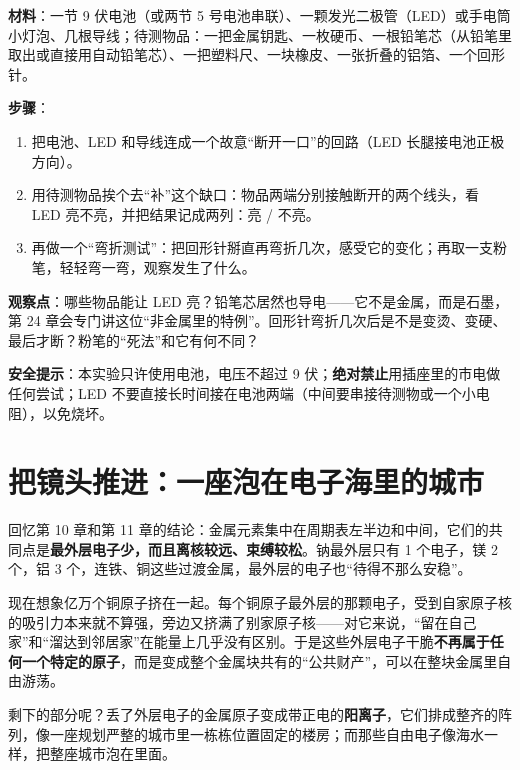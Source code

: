 \begin{shiyan}
\textbf{材料}：一节 9 伏电池（或两节 5 号电池串联）、一颗发光二极管（LED）或手电筒小灯泡、几根导线；待测物品：一把金属钥匙、一枚硬币、一根铅笔芯（从铅笔里取出或直接用自动铅笔芯）、一把塑料尺、一块橡皮、一张折叠的铝箔、一个回形针。

\textbf{步骤}：
\begin{enumerate}[itemsep=1pt]
\item 把电池、LED 和导线连成一个故意“断开一口”的回路（LED 长腿接电池正极方向）。
\item 用待测物品挨个去“补”这个缺口：物品两端分别接触断开的两个线头，看 LED 亮不亮，并把结果记成两列：亮 / 不亮。
\item 再做一个“弯折测试”：把回形针掰直再弯折几次，感受它的变化；再取一支粉笔，轻轻弯一弯，观察发生了什么。
\end{enumerate}

\textbf{观察点}：哪些物品能让 LED 亮？铅笔芯居然也导电——它不是金属，而是石墨，第 24 章会专门讲这位“非金属里的特例”。回形针弯折几次后是不是变烫、变硬、最后才断？粉笔的“死法”和它有何不同？

\textbf{安全提示}：本实验只许使用电池，电压不超过 9 伏；\textbf{绝对禁止}用插座里的市电做任何尝试；LED 不要直接长时间接在电池两端（中间要串接待测物或一个小电阻），以免烧坏。
\end{shiyan}

\section{把镜头推进：一座泡在电子海里的城市}

回忆第 10 章和第 11 章的结论：金属元素集中在周期表左半边和中间，它们的共同点是\textbf{最外层电子少，而且离核较远、束缚较松}。钠最外层只有 1 个电子，镁 2 个，铝 3 个，连铁、铜这些过渡金属，最外层的电子也“待得不那么安稳”。

现在想象亿万个铜原子挤在一起。每个铜原子最外层的那颗电子，受到自家原子核的吸引力本来就不算强，旁边又挤满了别家原子核——对它来说，“留在自己家”和“溜达到邻居家”在能量上几乎没有区别。于是这些外层电子干脆\textbf{不再属于任何一个特定的原子}，而是变成整个金属块共有的“公共财产”，可以在整块金属里自由游荡。

剩下的部分呢？丢了外层电子的金属原子变成带正电的\textbf{阳离子}，它们排成整齐的阵列，像一座规划严整的城市里一栋栋位置固定的楼房；而那些自由电子像海水一样，把整座城市泡在里面。

